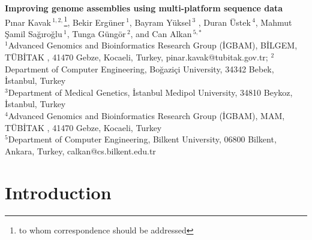 \documentclass[12pt]{article}
\begin{document}
 \renewcommand{\thefootnote}{\fnsymbol{footnote}} 

\begin{center}
  {\bf Improving genome assemblies using multi-platform sequence data}\\

  P\i nar Kavak\,$^{1,2,}$\footnote{to whom correspondence should be addressed},  Bekir Erg\"{u}ner\,$^{1}$, Bayram Y\"{u}ksel\,$^{3}$ , Duran \"{U}stek\,$^{4}$, Mahmut \c{S}amil Sa\u{g}\i ro\u{g}lu\,$^1$, 
  Tunga G\"{u}ng\"{o}r\,$^{2}$, and 
  Can Alkan\,$^{5,*}$ \\ 

  {\scriptsize
  $^{1}$Advanced Genomics and Bioinformatics Research Group (\.{I}GBAM), B\.{I}LGEM, %
  T\"{U}B\.{I}TAK%
, 41470 Gebze, Kocaeli, Turkey, pinar.kavak@tubitak.gov.tr;
  $^{2}$Department of Computer Engineering, Bo\u{g}azi\c{c}i University, 34342 Bebek, \.{I}stanbul, Turkey\\
  $^{3}$Department of Medical Genetics, \.{I}stanbul Medipol University, 34810 Beykoz, \.{I}stanbul, Turkey\\
  $^{4}$Advanced Genomics and Bioinformatics Research Group (\.{I}GBAM), MAM,%
  T\"{U}B\.{I}TAK%
, 41470 Gebze, Kocaeli, Turkey\\
  $^{5}$Department of Computer Engineering, Bilkent University, 06800 Bilkent, Ankara, Turkey, calkan@cs.bilkent.edu.tr
  }
\end{center}

\begin{abstract}
\textit{De novo} assembly problem with the short reads of next generation sequencing technologies still waits for innovative approaches. There exist assembly programs with different capabilities depending on the sequencing technology. Some of them are hybrid assemblers that use more than one input type. Improving the resulting assembly is another specialty. We propose a new method to improve the assembly when there is multiple input type obtained from different sequencing technologies: Illumina, 454 and Ion-Torrent. We also compare the results with the existing hybrid assemblers Celera and Masurca.

\end{abstract}

\onehalfspacing

\section{Introduction}
\end{document}

